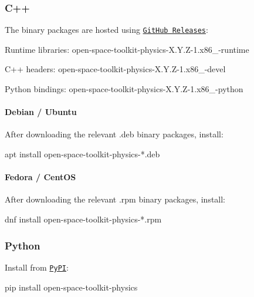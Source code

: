 \subsubsection*{C++}

The binary packages are hosted using \href{https://github.com/open-space-collective/open-space-toolkit-physics/releases}{\tt Git\+Hub Releases}\+:


\begin{DoxyItemize}
\item Runtime libraries\+: {\ttfamily open-\/space-\/toolkit-\/physics-\/\+X.\+Y.\+Z-\/1.\+x86\+\_-\/runtime}
\item C++ headers\+: {\ttfamily open-\/space-\/toolkit-\/physics-\/\+X.\+Y.\+Z-\/1.\+x86\+\_-\/devel}
\item Python bindings\+: {\ttfamily open-\/space-\/toolkit-\/physics-\/\+X.\+Y.\+Z-\/1.\+x86\+\_-\/python}
\end{DoxyItemize}

\paragraph*{Debian / Ubuntu}

After downloading the relevant {\ttfamily .deb} binary packages, install\+:


\begin{DoxyCode}
apt install open-space-toolkit-physics-*.deb
\end{DoxyCode}


\paragraph*{Fedora / Cent\+OS}

After downloading the relevant {\ttfamily .rpm} binary packages, install\+:


\begin{DoxyCode}
dnf install open-space-toolkit-physics-*.rpm
\end{DoxyCode}


\subsubsection*{Python}

Install from \href{https://pypi.org/project/open-space-toolkit-physics/}{\tt Py\+PI}\+:


\begin{DoxyCode}
pip install open-space-toolkit-physics
\end{DoxyCode}


